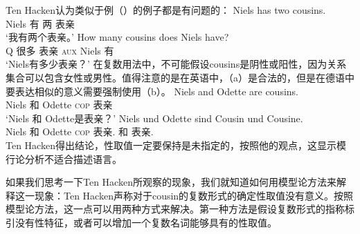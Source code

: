 \noindent
Ten Hacken认为类似于例（）的例子都是有问题的：
\eal
\ex 
\gll Niels has two cousins.\\
	 Niels 有 两 表亲\\
\glt `我有两个表亲。'
\ex 
\gll How many cousins does Niels have?\\
	Q 很多 表亲 \textsc{aux} Niels 有\\
\glt `Niels有多少表亲？'
\zl
在复数用法中，不可能假设cousins是阴性或阳性，因为关系集合可以包含女性或男性。值得注意的是在英语中，（a）是合法的，但是在德语中要表达相似的意义需要强制使用（b）。
\eal
\ex 
\gll Niels and Odette are cousins.\\
	Niels 和 Odette \textsc{cop} 表亲\\
\glt `Niels 和 Odette是表亲？'
\ex 
\gll Niels und Odette sind Cousin und Cousine.\\
	 Niels 和 Odette \textsc{cop} 表亲.\mas{} 和 表亲.\fem\\
\zl
Ten Hacken得出结论，性取值一定要保持是未指定的，按照他的观点，这显示模行论分析不适合描述语言。

如果我们思考一下Ten Hacken所观察的现象，我们就知道如何用模型论方法来解释这一现象：Ten Hacken声称对于cousin的复数形式的确定性取值没有意义。按照模型论方法，这一点可以用两种方式来解决。第一种方法是假设复数形式的指称标引没有性特征，或者可以增加一个复数名词能够具有的性取值。

